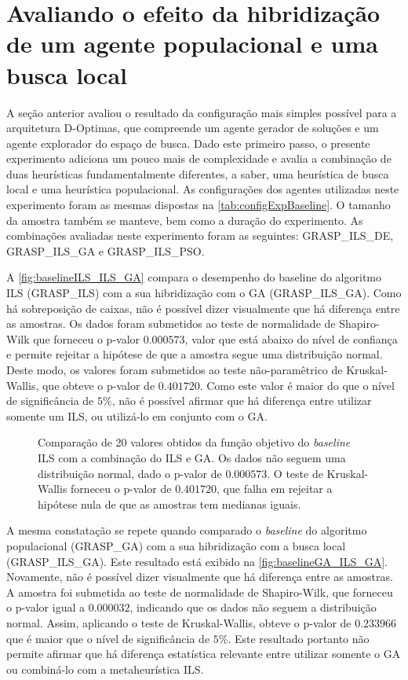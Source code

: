 \section{Avaliando o efeito da hibridização de um agente populacional e uma busca local}
\label{sec:popBuscaLocal}

A seção anterior avaliou o resultado da configuração mais simples possível para a arquitetura D-Optimas, que compreende um agente gerador de soluções e um agente explorador do espaço de busca. Dado este primeiro passo, o presente experimento adiciona um pouco mais de complexidade e avalia a combinação de duas heurísticas fundamentalmente diferentes, a saber, uma heurística de busca local e uma heurística populacional. As configurações dos agentes utilizadas neste experimento foram as mesmas dispostas na \autoref{tab:configExpBaseline}. O tamanho da amostra também se manteve, bem como a duração do experimento. As combinações avaliadas neste experimento foram as seguintes: GRASP\_ILS\_DE, GRASP\_ILS\_GA  e GRASP\_ILS\_PSO.

A \autoref{fig:baselineILS_ILS_GA} compara o desempenho do baseline do algoritmo ILS (GRASP\_ILS) com a sua hibridização com o GA (GRASP\_ILS\_GA). Como há sobreposição de caixas, não é possível dizer visualmente que há diferença entre as amostras. Os dados foram submetidos ao teste de normalidade de Shapiro-Wilk que forneceu o p-valor $0.000573$, valor que está abaixo do nível de confiança e permite rejeitar a hipótese de que a amostra segue uma distribuição normal. Deste modo, os valores foram submetidos ao teste não-paramêtrico de Kruskal-Wallis, que obteve o p-valor de $0.401720$. Como este valor é maior do que o nível de significância de $5\%$, não é possível afirmar que há diferença entre utilizar somente um ILS, ou utilizá-lo em conjunto com o GA. 

\begin{figure}
    \centering
    \caption{Comparação de 20 valores obtidos da função objetivo do \textit{baseline} ILS com a combinação do ILS e GA. Os dados não seguem uma distribuição normal, dado o p-valor de $0.000573$. O teste de Kruskal-Wallis forneceu o p-valor de $0.401720$, que falha em rejeitar a hipótese nula de que as amostras tem medianas iguais. }
    
    \label{fig:baselineILS_ILS_GA}
\end{figure}


A mesma constatação se repete quando comparado o \textit{baseline} do algoritmo populacional (GRASP\_GA) com a sua hibridização com a busca local (GRASP\_ILS\_GA). Este resultado está exibido na  \autoref{fig:baselineGA_ILS_GA}. Novamente, não é possível dizer visualmente que há diferença entre as amostras. A amostra foi submetida ao teste de normalidade de Shapiro-Wilk, que forneceu o p-valor igual a $0.000032$, indicando que os dados não seguem a distribuição normal. Assim, aplicando o teste de Kruskal-Wallis, obteve o p-valor de $0.233966$ que é maior que o nível de significância de $5\%$. Este resultado portanto não permite afirmar que há diferença estatística relevante entre utilizar somente o GA ou combiná-lo com a metaheurística ILS.


